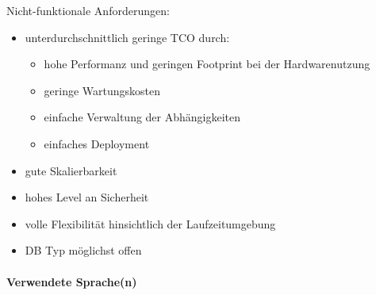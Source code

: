 \documentclass[notitlepage, hidelinks]{article}
\begin{document}
Nicht-funktionale Anforderungen: 
\begin{itemize}
\item unterdurchschnittlich geringe TCO durch:
\begin{itemize}
\item hohe Performanz und geringen Footprint bei der Hardwarenutzung
\item geringe Wartungskosten
\item einfache Verwaltung der Abhängigkeiten
\item einfaches Deployment
\end{itemize}
\item gute Skalierbarkeit
\item hohes Level an Sicherheit
\item volle Flexibilität hinsichtlich der Laufzeitumgebung
\item DB Typ möglichst offen
\end{itemize}



\paragraph{Verwendete Sprache(n)} \mbox{} \\
\end{document}
